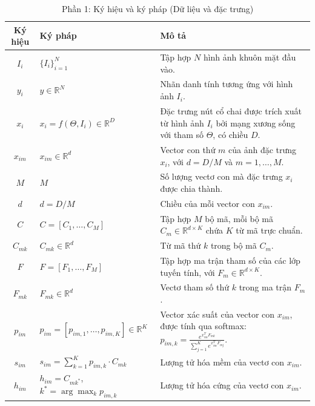 \begin{table}[h!]
    \centering
    \begin{tabular}{|c|p{3cm}|p{6cm}|}
        \hline
        \textbf{Ký hiệu} & \textbf{Ký pháp} & \textbf{Mô tả} \\ \hline
        $I_i$ & $\{I_i\}_{i=1}^N$ & Tập hợp $N$ hình ảnh khuôn mặt đầu vào. \\ \hline
        $y_i$ & $y \in \mathbb{R}^N$ & Nhãn danh tính tương ứng với hình ảnh $I_i$. \\ \hline
        $x_i$ & $x_i = f(\Theta, I_i) \in \mathbb{R}^D$ & Đặc trưng nút cổ chai được trích xuất từ hình ảnh $I_i$ bởi mạng xương sống với tham số $\Theta$, có chiều $D$. \\ \hline
        $x_{im}$ & $x_{im} \in \mathbb{R}^d$ & Vector con thứ $m$ của ảnh đặc trưng $x_i$, với $d = D/M$ và $m = 1, \dots, M$. \\ \hline
        $M$ & $M$ & Số lượng vectơ con mà đặc trưng $x_i$ được chia thành. \\ \hline
        $d$ & $d = D/M$ & Chiều của mỗi vector con $x_{im}$. \\ \hline
        $C$ & $C = [C_1, \dots, C_M]$ & Tập hợp $M$ bộ mã, mỗi bộ mã $C_m \in \mathbb{R}^{d \times K}$ chứa $K$ từ mã trực chuẩn. \\ \hline
        $C_{mk}$ & $C_{mk} \in \mathbb{R}^d$ & Từ mã thứ $k$ trong bộ mã $C_m$. \\ \hline
        $F$ & $F = [F_1, \dots, F_M]$ & Tập hợp ma trận tham số của các lớp tuyến tính, với $F_m \in \mathbb{R}^{d \times K}$. \\ \hline
        $F_{mk}$ & $F_{mk} \in \mathbb{R}^d$ & Vectơ tham số thứ $k$ trong ma trận $F_m$. \\ \hline
        $p_{im}$ & $p_{im} = [p_{im,1}, \dots, p_{im,K}] \in \mathbb{R}^K$ & Vector xác suất của vector con $x_{im}$, được tính qua softmax: $p_{im,k} = \frac{e^{x_{im}^T F_{mk}}}{\sum_{j=1}^K e^{x_{im}^T F_{mj}}}$. \\ \hline
        $s_{im}$ & $s_{im} = \sum_{k=1}^K p_{im,k} \cdot C_{mk}$ & Lượng tử hóa mềm của vectơ con $x_{im}$. \\ \hline
        $h_{im}$ & $h_{im} = C_{m k^*}$, $k^* = \arg\max_k p_{im,k}$ & Lượng tử hóa cứng của vectơ con $x_{im}$. \\ \hline
    \end{tabular}
    \caption{Phần 1: Ký hiệu và ký pháp (Dữ liệu và đặc trưng)}
    \label{tab:terms_part1}
\end{table}

